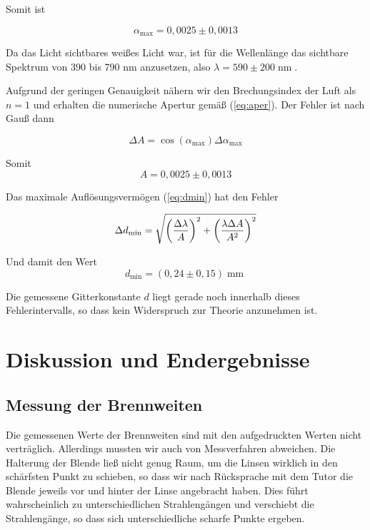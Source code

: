 \documentclass[a4paper,german,12pt,smallheadings]{scrartcl}
\begin{document}
Somit ist

\begin{equation}
  \alpha_\text{max} = 0{,}0025\pm0{,}0013
\end{equation}

Da das Licht sichtbares weißes Licht war, ist für die Wellenlänge das sichtbare
Spektrum von 390 bis 790 nm anzusetzen, also $\lambda = 590\pm200
\operatorname{nm}$.

Aufgrund der geringen Genauigkeit nähern wir den Brechungsindex der Luft als
$n=1$ und erhalten die numerische Apertur gemäß (\ref{eq:aper}). Der Fehler ist
nach Gauß dann

\begin{equation}
  \Delta A = \cos(\alpha_\text{max}) \Delta \alpha_\text{max}
\end{equation}

Somit
\begin{equation}
  A = 0{,}0025 \pm 0{,}0013
\end{equation}

Das maximale Auflösungsvermögen (\ref{eq:dmin}) hat den Fehler

\begin{equation}
  \Delta d_\text{min} = \sqrt{
    \del{\frac{\Delta \lambda}{A}}^2 +
    \del{\frac{\lambda \Delta A}{A^2}}^2
  }
\end{equation}

Und damit den Wert
\begin{equation}
  d_\text{min} = (0{,}24 \pm 0{,}15) \operatorname{mm}
\end{equation}

Die gemessene Gitterkonstante $d$ liegt gerade noch innerhalb dieses
Fehlerintervalls, so dass kein Widerspruch zur Theorie anzunehmen ist.

\section{Diskussion und Endergebnisse}

\subsection{Messung der Brennweiten}

Die gemessenen Werte der Brennweiten sind mit den aufgedruckten Werten nicht
verträglich. Allerdings mussten wir auch von Messverfahren abweichen. Die
Halterung der Blende ließ nicht genug Raum, um die Linsen wirklich in den
schärfsten Punkt zu schieben, so dass wir nach Rücksprache mit dem Tutor die
Blende jeweils vor und hinter der Linse angebracht haben. Dies führt
wahrscheinlich zu unterschiedlichen Strahlengängen und verschiebt die
Strahlengänge, so dass sich unterschiedliche scharfe Punkte ergeben.
\end{document}
